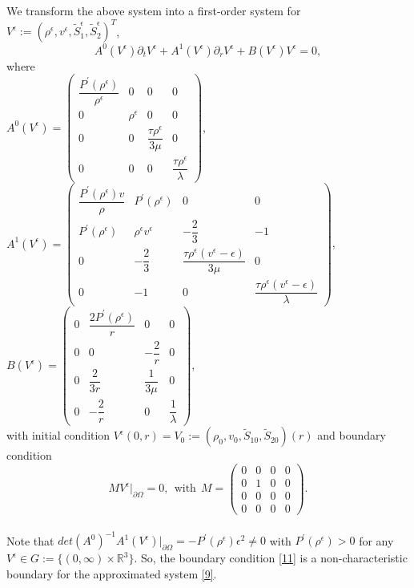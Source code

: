 \documentclass[10pt,reqno]{amsart}
\numberwithin{equation}{section}
\begin{document}
	We transform the above system into a first-order system for $V^\epsilon:=(\rho^\epsilon,v^\epsilon,\tilde{S}_1^{\epsilon},\tilde{S}_2^{\epsilon})^{T}$,
	\begin{equation}
		A^0(V^\epsilon)\partial_{t}V^\epsilon+A^1(V^\epsilon)\partial_{r}V^\epsilon+B(V^\epsilon)V^\epsilon=0,
	\end{equation} 
	where\\
	$A^0(V^\epsilon)=\left(\begin{array}{ccccc}
		\dfrac{P^{\prime}(\rho^\epsilon)}{\rho^\epsilon} & 0 & 0 & 0 \\
		0 & \rho^\epsilon & 0 & 0 \\
		0 & 0 & \dfrac{\tau  \rho^\epsilon}{3\mu} & 0 \\
		0 & 0 & 0 & \dfrac{\tau \rho^\epsilon}{\lambda}  
	\end{array}\right)$,
	$
	A^1(V^\epsilon)=\left(\begin{array}{ccccc}
		\dfrac{P^{\prime}(\rho^\epsilon)v}{\rho} & P^{\prime}(\rho^\epsilon) & 0 & 0 \\
		P^{\prime}(\rho^\epsilon) & \rho^\epsilon v^\epsilon & -\dfrac{2}{3} & -1 \\
		0 & -\dfrac{2}{3}  & \dfrac{\tau   \rho^\epsilon(v^\epsilon-\epsilon) }{3\mu} & 0 \\
		0 & -1 & 0 &  \dfrac{\tau \rho^\epsilon(v^\epsilon-\epsilon)}{\lambda}
	\end{array}\right)$,\\
	$B(V^\epsilon)=\left(\begin{array}{ccccc}
		0 & \dfrac{2 P^{\prime}(\rho^\epsilon)}{r} & 0 & 0  \\
		0 & 0 & -\dfrac{2}{r} & 0  \\
		0 & \dfrac{2}{3r}  & \dfrac{1}{3\mu} & 0  \\
		0 & -\dfrac{2}{r} & 0 & \dfrac{1}{\lambda}
	\end{array}\right)$,\\
	with initial condition $V^\epsilon(0,r)=V_0:=(\rho_0,v_0,\tilde{S}_{10},\tilde{S}_{20})(r)$ 
	and boundary condition
	$$MV^\epsilon\big|_{\partial\Omega}=0,~~\text{with} 
	~~M=\left(\begin{array}{ccccc}
		0 & 0 & 0 & 0 \\
		0 & 1 & 0 & 0 \\
		0 & 0 & 0 & 0 \\
		0 & 0 & 0 & 0  
	\end{array}\right).$$\\
	
	Note that $det(A^0)^{-1}A^1(V^\epsilon)\big|_{\partial\Omega}=-P^{\prime}(\rho^\epsilon)\epsilon^2\neq0$
	with $P^{\prime}(\rho^\epsilon)>0$ for any $V^\epsilon\in G:=\{(0,\infty)\times\mathbb{R}^3\}$. So, the boundary condition \eqref{11} is a non-characteristic boundary for the approximated system \eqref{9}. 
	
\end{document}
